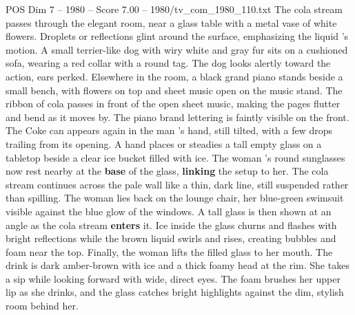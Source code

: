 \begin{textsample}{POS Dim 7 – 1980 – Score 7.00 – 1980/tv\_com\_1980\_110.txt}
The cola stream passes through the elegant room, near a glass table with a metal vase of white flowers.
Droplets or reflections glint around the surface, emphasizing the liquid ’s motion.
A small terrier-like dog with wiry white and gray fur sits on a cushioned sofa, wearing a red collar with a round tag.
The dog looks alertly toward the action, ears perked.
Elsewhere in the room, a black grand piano stands beside a small bench, with flowers on top and sheet music open on the music stand.
The ribbon of cola passes in front of the open sheet music, making the pages flutter and bend as it moves by.
The piano brand lettering is faintly visible on the front.
The Coke can appears again in the man ’s hand, still tilted, with a few drops trailing from its opening.
A hand places or steadies a tall empty glass on a tabletop beside a clear ice bucket filled with ice.
The woman ’s round sunglasses now rest nearby at the \textbf{base} of the glass, \textbf{linking} the setup to her.
The cola stream continues across the pale wall like a thin, dark line, still suspended rather than spilling.
The woman lies back on the lounge chair, her blue-green swimsuit visible against the blue glow of the windows.
A tall glass is then shown at an angle as the cola stream \textbf{enters} it.
Ice inside the glass churns and flashes with bright reflections while the brown liquid swirls and rises, creating bubbles and foam near the top.
Finally, the woman lifts the filled glass to her mouth.
The drink is dark amber-brown with ice and a thick foamy head at the rim.
She takes a sip while looking forward with wide, direct eyes.
The foam brushes her upper lip as she drinks, and the glass catches bright highlights against the dim, stylish room behind her.

\end{textsample}
